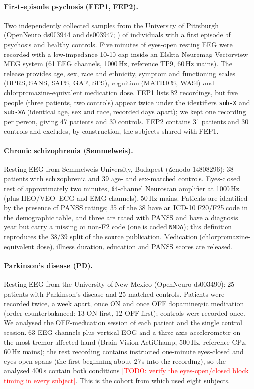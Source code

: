 \documentclass[11pt]{article}
\newcommand{\todo}[1]{\textcolor{red}{[TODO: #1]}}
\begin{document}
\paragraph{First-episode psychosis (FEP1, FEP2).}
Two independently collected samples from the University of Pittsburgh (OpenNeuro ds003944 and ds003947; \citealp{salisbury_ds003944,salisbury_ds003947}) of individuals with a first episode of psychosis and healthy controls.
Five minutes of eyes-open resting EEG were recorded with a low-impedance 10-10 cap inside an Elekta Neuromag Vectorview MEG system (61 EEG channels, 1000\,Hz, reference TP9, 60\,Hz mains).
The release provides age, sex, race and ethnicity, symptom and functioning scales (BPRS, SANS, SAPS, GAF, SFS), cognition (MATRICS, WASI) and chlorpromazine-equivalent medication dose.
FEP1 lists 82 recordings, but five people (three patients, two controls) appear twice under the identifiers \texttt{sub-X} and \texttt{sub-XA} (identical age, sex and race, recorded days apart); we kept one recording per person, giving 47 patients and 30 controls.
FEP2 contains 31 patients and 30 controls and excludes, by construction, the subjects shared with FEP1.

\paragraph{Chronic schizophrenia (Semmelweis).}
Resting EEG from Semmelweis University, Budapest \citep{racz2025} (Zenodo 14808296): 38 patients with schizophrenia and 39 age- and sex-matched controls.
Eyes-closed rest of approximately two minutes, 64-channel Neuroscan amplifier at 1000\,Hz (plus HEO/VEO, ECG and EMG channels), 50\,Hz mains.
Patients are identified by the presence of PANSS ratings; 35 of the 38 have an ICD-10 F20/F25 code in the demographic table, and three are rated with PANSS and have a diagnosis year but carry a missing or non-F2 code (one is coded \texttt{NMDA}); this definition reproduces the 38/39 split of the source publication.
Medication (chlorpromazine-equivalent dose), illness duration, education and PANSS scores are released.

\paragraph{Parkinson's disease (PD).}
Resting EEG from the University of New Mexico \citep{cavanagh_ds003490} (OpenNeuro ds003490): 25 patients with Parkinson's disease and 25 matched controls.
Patients were recorded twice, a week apart, once ON and once OFF dopaminergic medication (order counterbalanced: 13 ON first, 12 OFF first); controls were recorded once.
We analysed the OFF-medication session of each patient and the single control session.
63 EEG channels plus vertical EOG and a three-axis accelerometer on the most tremor-affected hand (Brain Vision ActiChamp, 500\,Hz, reference CPz, 60\,Hz mains); the rest recording contains instructed one-minute eyes-closed and eyes-open spans (the first beginning about 27\,s into the recording), so the analysed 400\,s contain both conditions \todo{verify the eyes-open/closed block timing in every subject}.
This is the cohort from which \citet{yao2025catd} used eight subjects.
\end{document}
